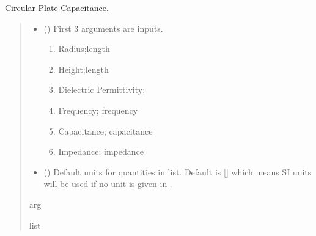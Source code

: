 \documentclass[letterpaper,10pt,english]{sphinxmanual}
\begin{document}
\begin{fulllineitems}
\label{\detokenize{components:components.CircularPlateCap}}
\pysigstartsignatures
{}
\pysigstopsignatures
\sphinxAtStartPar
Circular Plate Capacitance.
\begin{quote}\begin{description}
\begin{itemize}
\item {}
\sphinxAtStartPar
{} () \textendash{}
\sphinxAtStartPar
First 3 arguments are inputs.
\begin{enumerate}
%
\item {}
\sphinxAtStartPar
Radius;length

\item {}
\sphinxAtStartPar
Height;length

\item {}
\sphinxAtStartPar
Dielectric Permittivity;

\item {}
\sphinxAtStartPar
Frequency; frequency

\item {}
\sphinxAtStartPar
Capacitance; capacitance

\item {}
\sphinxAtStartPar
Impedance; impedance

\end{enumerate}


\item {}
\sphinxAtStartPar
{} (\sphinxstyleliteralemphasis{\sphinxupquote{, }}) \textendash{} Default units for quantities in  list. Default is {[}{]} which means SI units will be used if no unit is given in .

\end{itemize}

\sphinxAtStartPar
arg

\sphinxAtStartPar
list

\end{description}\end{quote}

\end{fulllineitems}
\end{document}
